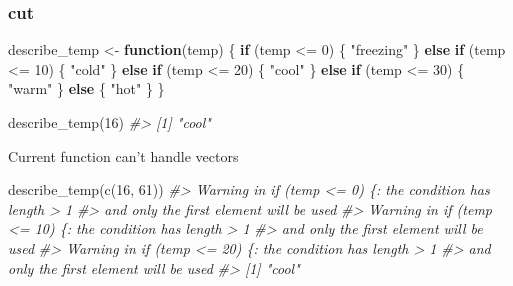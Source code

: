 \documentclass[
]{book}
\newenvironment{Shaded}{\begin{snugshade}}{\end{snugshade}}
\newcommand{\CommentTok}[1]{\textcolor[rgb]{0.56,0.35,0.01}{\textit{#1}}}
\newcommand{\ControlFlowTok}[1]{\textcolor[rgb]{0.13,0.29,0.53}{\textbf{#1}}}
\newcommand{\DecValTok}[1]{\textcolor[rgb]{0.00,0.00,0.81}{#1}}
\newcommand{\FunctionTok}[1]{\textcolor[rgb]{0.00,0.00,0.00}{#1}}
\newcommand{\NormalTok}[1]{#1}
\newcommand{\OtherTok}[1]{\textcolor[rgb]{0.56,0.35,0.01}{#1}}
\newcommand{\SpecialCharTok}[1]{\textcolor[rgb]{0.00,0.00,0.00}{#1}}
\newcommand{\StringTok}[1]{\textcolor[rgb]{0.31,0.60,0.02}{#1}}
\begin{document}
\hypertarget{cut}{%
\subsubsection{cut}\label{cut}}

\begin{Shaded}
\begin{Highlighting}[]
\NormalTok{describe\_temp }\OtherTok{\textless{}{-}} \ControlFlowTok{function}\NormalTok{(temp) \{}
  \ControlFlowTok{if}\NormalTok{ (temp }\SpecialCharTok{\textless{}=} \DecValTok{0}\NormalTok{) \{}
    \StringTok{"freezing"}
\NormalTok{  \} }\ControlFlowTok{else} \ControlFlowTok{if}\NormalTok{ (temp }\SpecialCharTok{\textless{}=} \DecValTok{10}\NormalTok{) \{}
    \StringTok{"cold"}
\NormalTok{  \} }\ControlFlowTok{else} \ControlFlowTok{if}\NormalTok{ (temp }\SpecialCharTok{\textless{}=} \DecValTok{20}\NormalTok{) \{}
    \StringTok{"cool"}
\NormalTok{  \} }\ControlFlowTok{else} \ControlFlowTok{if}\NormalTok{ (temp }\SpecialCharTok{\textless{}=} \DecValTok{30}\NormalTok{) \{ }
    \StringTok{"warm"}
\NormalTok{  \} }\ControlFlowTok{else}\NormalTok{ \{}
    \StringTok{"hot"}
\NormalTok{  \}}
\NormalTok{\}}
\end{Highlighting}
\end{Shaded}

\begin{Shaded}
\begin{Highlighting}[]
\FunctionTok{describe\_temp}\NormalTok{(}\DecValTok{16}\NormalTok{)}
\CommentTok{\#\textgreater{} [1] "cool"}
\end{Highlighting}
\end{Shaded}

Current function can't handle vectors

\begin{Shaded}
\begin{Highlighting}[]
\FunctionTok{describe\_temp}\NormalTok{(}\FunctionTok{c}\NormalTok{(}\DecValTok{16}\NormalTok{, }\DecValTok{61}\NormalTok{))}
\CommentTok{\#\textgreater{} Warning in if (temp \textless{}= 0) \{: the condition has length \textgreater{} 1}
\CommentTok{\#\textgreater{} and only the first element will be used}
\CommentTok{\#\textgreater{} Warning in if (temp \textless{}= 10) \{: the condition has length \textgreater{} 1}
\CommentTok{\#\textgreater{} and only the first element will be used}
\CommentTok{\#\textgreater{} Warning in if (temp \textless{}= 20) \{: the condition has length \textgreater{} 1}
\CommentTok{\#\textgreater{} and only the first element will be used}
\CommentTok{\#\textgreater{} [1] "cool"}
\end{Highlighting}
\end{Shaded}
\end{document}
